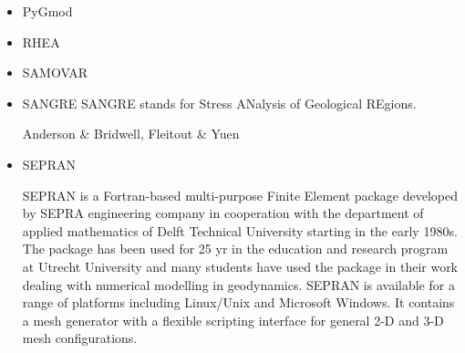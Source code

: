 \begin{itemize}
{\small
\noindent
\cite{aakw13}
}

\item PyGmod 

{\small
\noindent
\cite{crvs15}
}


\item RHEA 

{\small
\noindent
\cite{bugg08}
\cite{stgb10}
\cite{algs12}
\cite{busa13}
}

\item SAMOVAR

{\small
\noindent
\cite{egat10}
}


\item {\codefont SANGRE} 
SANGRE stands for Stress ANalysis of Geological REgions.

\begin{scriptsize}
Anderson \& Bridwell\cite{anbr80},
Fleitout \& Yuen \cite{flyu84,flyu84b}
\end{scriptsize}

\item {\codefont SEPRAN} 

SEPRAN \cite{sepr05} is a Fortran-based
multi-purpose Finite Element package developed by SEPRA engineering company in
cooperation with the department of applied mathematics of Delft Technical University
starting in the early 1980s. The package has been used for 25 yr in the education and
research program at Utrecht University and many students have used the package in
their work dealing with numerical modelling in geodynamics. SEPRAN is available for
a range of platforms including Linux/Unix and Microsoft Windows. It contains a mesh
generator with a flexible scripting interface for general 2-D and 3-D mesh configurations.


\end{itemize}
